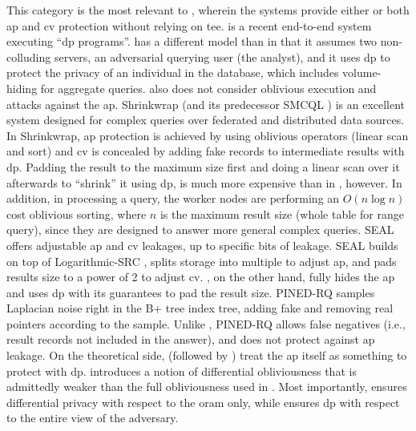 			This category is the most relevant to \epsolute{}, wherein the systems provide either or both \acrshort{ap} and \acrshort{cv} protection without relying on \acrshort{tee}.
			\crypte{} \cite{crypte} is a recent end-to-end system executing ``\acrshort{dp} programs''.
			\crypte{} has a different model than \epsolute{} in that it assumes two non-colluding servers, an adversarial querying user (the analyst), and it uses \acrshort{dp} to protect the privacy of an individual in the database, which includes volume-hiding for aggregate queries.
			\crypte{} also does not consider oblivious execution and attacks against the \acrshort{ap}.
			Shrinkwrap \cite{shrinkwrap} (and its predecessor SMCQL \cite{smcql}) is an excellent system designed for complex queries over federated and distributed data sources.
			In Shrinkwrap, \acrshort{ap} protection is achieved by using oblivious operators (linear scan and sort) and \acrshort{cv} is concealed by adding fake records to intermediate results with \acrshort{dp}.
			Padding the result to the maximum size first and doing a linear scan over it afterwards to ``shrink'' it using \acrshort{dp}, is much more expensive than in \epsolute{}, however.
			In addition, in processing a query, the worker nodes are performing an $O(n \log{n})$ cost oblivious sorting, where $n$ is the maximum result size (whole table for range query), since they are designed to answer more general complex queries.
			SEAL \cite{seal} offers adjustable \acrshort{ap} and \acrshort{cv} leakages, up to specific bits of leakage.
			SEAL builds on top of Logarithmic-SRC \cite{practical-range-search}, splits storage into multiple  to adjust \acrshort{ap}, and pads results size to a power of 2 to adjust \acrshort{cv}.
			\epsolute{}, on the other hand, fully hides the \acrshort{ap} and uses \acrshort{dp} with its guarantees to pad the result size.
			PINED-RQ \cite{pined-rq} samples Laplacian noise right in the B+ tree index tree, adding fake and removing real pointers according to the sample.
			Unlike \epsolute{}, PINED-RQ allows false negatives (i.e., result records not included in the answer), and does not protect against \acrshort{ap} leakage.
			On the theoretical side, \textcite{differential-obliviousness} (followed by \textcite{differential-obliviousness-followup}) treat the \acrshort{ap} itself as something to protect with \acrshort{dp}.
			\cite{differential-obliviousness} introduces a notion of differential obliviousness that is admittedly weaker than the full obliviousness used in \epsolute{}. %
			Most importantly, \cite{differential-obliviousness} ensures differential privacy with respect to the \acrshort{oram} only, while \epsolute{} ensures \acrshort{dp} with respect to the entire view of the adversary. %

